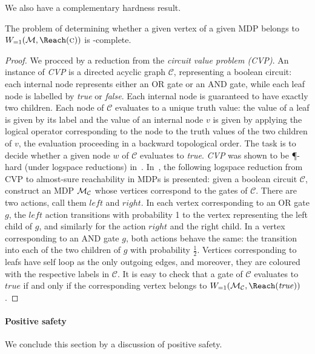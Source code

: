 We also have a complementary hardness result. 

\begin{theorem}
\label{5-thm:as-complexity}
The problem of determining whether a given vertex of a given MDP belongs to 
$\winAS(\mdp,\Reach(\genColour))$ is \PTIME-complete.
\end{theorem}
\begin{proof}
	We procced by a reduction 
	from the \emph{circuit value problem (CVP)}.
	An instance of \emph{CVP} is a directed acyclic graph $\mathcal{C}$, 
	representing a boolean circuit: each internal node represents either an OR gate 
	or an AND gate, while each leaf node is labelled by \emph{true} or 
	\emph{false}. Each internal node is guaranteed to have exactly two children. 
	Each node of $\mathcal{C}$ evaluates to a unique truth value: the value of a 
	leaf is given by its label and the value of an internal node $v$ is given by 
	applying the logical operator corresponding to the node to the truth values of 
	the two children of $v$, the evaluation proceeding in a backward topological order. The task is to decide whether a given node $w$ of 
	$\mathcal{C}$ evaluates to \emph{true}. \emph{CVP} was shown to be 
	\P-hard (under logspace reductions) in~\cite{Ladner:1975}. 
	In~\cite{Chatterjee&Doyen&Henzinger:2010}, the following logspace reduction 
	from CVP to 
	almost-sure reachability in MDPs is presented: given a boolean circuit 
	$\mathcal{C}$, construct an MDP $\mathcal{M}_{\mathcal{C}}$ whose vertices correspond 
	to the gates 
	of $\mathcal{C}$. There are two actions, call them $\mathit{left}$ and $\mathit{right}$. In each vertex corresponding to an OR gate $g$, the 
	$\mathit{left}$ action transitions with probability 1 to the vertex 
	representing the left child of $g$, and similarly for the action 
	$\mathit{right}$ 
	and the right child. In a vertex corresponding to an AND gate $g$, both actions behave the same: the transition into each of the two children 
	of $g$ with probability $\frac{1}{2}$. Vertices corresponding to leafs have self loop as the only outgoing edges, and 
	moreover, they are coloured with the respective labels in $\mathcal{C}$. It is 
	easy to check that a gate of $\mathcal{C}$ evaluates to $\mathit{true}$ if and 
	only if the corresponding vertex belongs to 
	$\winAS(\mdp_{\mathcal{C}},\Reach(\mathit{true}))$.
\end{proof}

\paragraph{Positive safety} We conclude this section by a discussion of positive safety. 


